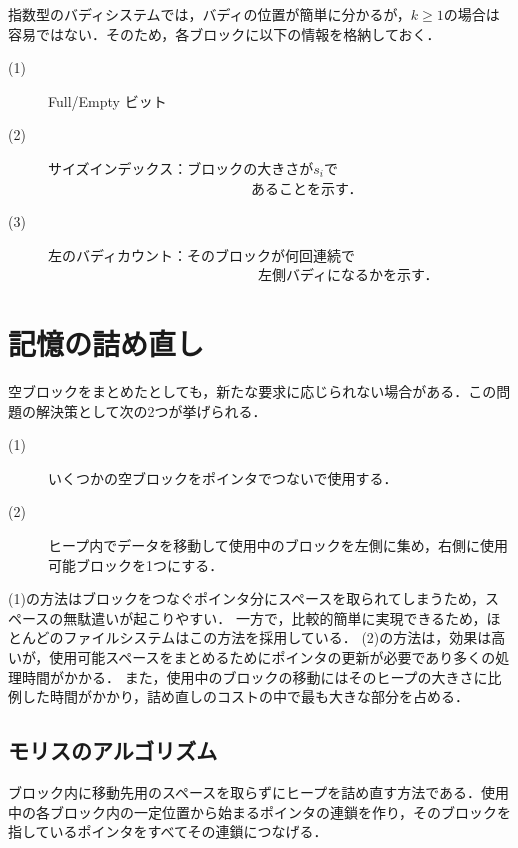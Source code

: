 \documentclass[twocolumn,10pt]{jarticle}
\begin{document}
指数型のバディシステムでは，バディの位置が簡単に分かるが，$ k \ge 1 $の場合は容易ではない．そのため，各ブロックに以下の情報を格納しておく．
%

\begin{description}
 \item[(1)] Full/Empty ビット
 \item[(2)] サイズインデックス：ブロックの大きさが$ s_i $で\\ ~~~~~~~~~~~~~~~~~~~~~~~~~~~~~あることを示す．
 \item[(3)] 左のバディカウント：そのブロックが何回連続で\\ ~~~~~~~~~~~~~~~~~~~~~~~~~~~~~~左側バディになるかを示す．
\end{description}
%


\section{記憶の詰め直し}
%
空ブロックをまとめたとしても，新たな要求に応じられない場合がある．この問題の解決策として次の2つが挙げられる．
%
\begin{description}
 \item[(1)] いくつかの空ブロックをポインタでつないで使用する．
 \item[(2)] ヒープ内でデータを移動して使用中のブロックを左側に集め，右側に使用可能ブロックを1つにする．
\end{description}
%

(1)の方法はブロックをつなぐポインタ分にスペースを取られてしまうため，スペースの無駄遣いが起こりやすい．
一方で，比較的簡単に実現できるため，ほとんどのファイルシステムはこの方法を採用している．
(2)の方法は，効果は高いが，使用可能スペースをまとめるためにポインタの更新が必要であり多くの処理時間がかかる．
また，使用中のブロックの移動にはそのヒープの大きさに比例した時間がかかり，詰め直しのコストの中で最も大きな部分を占める．


\subsection{モリスのアルゴリズム}
%
ブロック内に移動先用のスペースを取らずにヒープを詰め直す方法である．使用中の各ブロック内の一定位置から始まるポインタの連鎖を作り，そのブロックを指しているポインタをすべてその連鎖につなげる．
\end{document}
